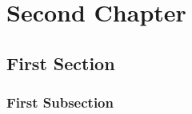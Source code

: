 \chapter{Second Chapter}
\lipsum[1-10]
\section{First Section}
\lipsum[1-10]
\subsection{First Subsection}
\lipsum[1-10]